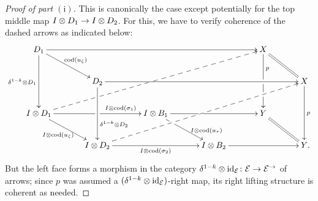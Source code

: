 \documentclass[reqno,10pt,a4paper,oneside,draft]{amsart}
\begin{document}
\begin{proof}[Proof of part $\mathrm{(i)}$]
This is canonically the case except potentially for the top middle map $I \otimes D_1 \to I \otimes D_2$.
For this, we have to verify coherence of the dashed arrows as indicated below:
\[
\xymatrix@C+1em{
  D_1
  \ar[rrrr]
  \ar[dd]_{\kcylinv \otimes D_1}
  \ar[dr]^{\cod(u_{\zeta})}
&&&&
  X
  \ar[dd]^(0.3){p}|!{[dlll];[dr]}{\hole}|!{[dddlll];[dr]}{\hole}
  \ar@{=}[dr]
\\&
  D_2
  \ar[rrrr]
  \ar[dd]^(0.66){\kcylinv \otimes D_2}
&&&&
  X
  \ar[dd]^{p}
\\
  \interval \otimes D_1
  \ar[rr]^(0.7){I \otimes \cod(\sigma_1)}|!{[ur];[dr]}{\hole}
  \ar@{-->}[uurrrr]|!{[ur];[dr]}{\hole}|!{[ur];[urrrrr]}{\hole} %
  \ar[dr]_{I \otimes \cod(u_{\zeta})}
&&
  \interval \otimes B_1
  \ar[rr]|!{[dl];[urrr]}{\hole}
  \ar[dr]^(0.7){\interval \otimes \cod(u_\tau)}|!{[dl];[urrr]}{\hole}
&&
  Y
  \ar@{=}[dr]
\\&
  \interval \otimes D_2
  \ar[rr]_{I \otimes \cod(\sigma_2)}
  \ar@{-->}[uurrrr]
&&
  \interval \otimes B_2
  \ar[rr]
&&
  Y
\rlap{.}}
\]
But the left face forms a morphism in the category $\delta^{1-k} \otimes \operatorname{id}_{\mathcal{E}} \colon \mathcal{E} \to \mathcal{E}^\to$ of arrows; since $p$ was assumed a $(\delta^{1-k} \otimes \operatorname{id}_{\mathcal{E}})$-right map, its right lifting structure is coherent as needed.
\end{proof}
\end{document}
